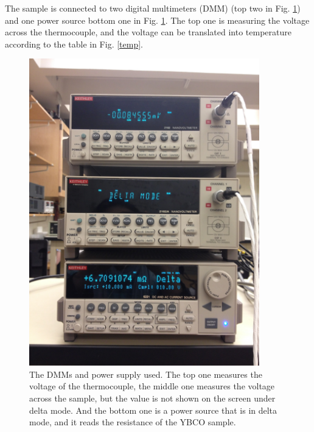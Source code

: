 \documentclass[prb,preprint]{revtex4-1}
\begin{document}
The sample is connected to two digital multimeters (DMM) (top two in Fig. \ref{meters}) and one power source {bottom one in Fig. \ref{meters}}. The top one is measuring the voltage across the thermocouple, and the voltage can be translated into temperature according to the table in Fig. \ref{temp}. \\

\begin{figure}[h]
\centering
\includegraphics[width=10cm]{ybcometers.jpg}
\caption{The DMMs and power supply used. The top one measures the voltage of the thermocouple, the middle one measures the voltage across the sample, but the value is not shown on the screen under delta mode. And the bottom one is a power source that is in delta mode, and it reads the resistance of the YBCO sample.}
\label{meters}
\end{figure}
\end{document}
